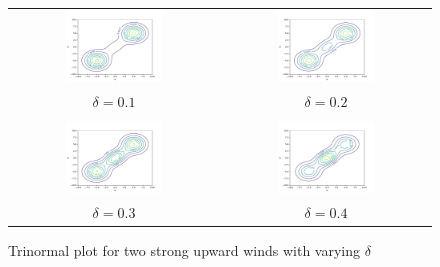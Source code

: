 \begin{figure}
    \centering
    \begin{tabular}{cc}
        \multicolumn{1}{c}{\includegraphics[width=0.48\textwidth]{include/figures/plot3_1}} &
        \multicolumn{1}{c}{\includegraphics[width=0.48\textwidth]{include/figures/plot3_2}} \\
        $\delta = 0.1$ & $\delta = 0.2$ \\ \\
        \multicolumn{1}{c}{\includegraphics[width=0.48\textwidth]{include/figures/plot3_3}} &
        \multicolumn{1}{c}{\includegraphics[width=0.48\textwidth]{include/figures/plot3_4}} \\
        $\delta = 0.3$ & $\delta = 0.4$
    \end{tabular}
    \caption{Trinormal plot for two strong upward winds with varying $\delta$}
    \label{fig:plot3}
\end{figure}

